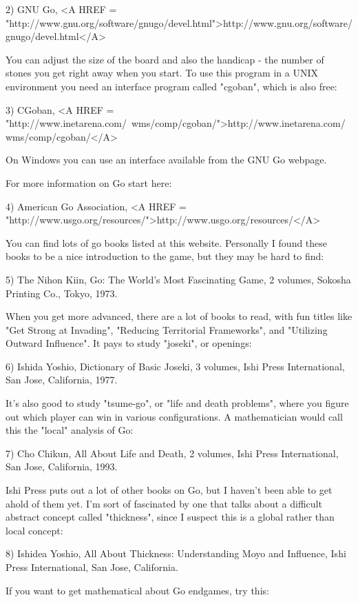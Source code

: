 2) GNU Go, <A HREF = "http://www.gnu.org/software/gnugo/devel.html">http://www.gnu.org/software/gnugo/devel.html</A>

You can adjust the size of the board and also the handicap - the number
of stones you get right away when you start.  To use this program in a
UNIX environment you need an interface program called
"cgoban", which is also free:

3) CGoban, <A HREF = "http://www.inetarena.com/~wms/comp/cgoban/">http://www.inetarena.com/~wms/comp/cgoban/</A>

On Windows you can use an interface available from the GNU Go webpage.

For more information on Go start here:

4) American Go Association, <A HREF = "http://www.usgo.org/resources/">http://www.usgo.org/resources/</A>

You can find lots of go books listed at this website.  Personally
I found these books to be a nice introduction to the game, but they
may be hard to find:

5) The Nihon Kiin, Go: The World's Most Fascinating Game, 2 volumes,
Sokosha Printing Co., Tokyo, 1973.

When you get more advanced, there are a lot of books to read, with 
fun titles like "Get Strong at Invading", "Reducing Territorial 
Frameworks", and "Utilizing Outward Influence".  It pays to study
"joseki", or openings:

6) Ishida Yoshio, Dictionary of Basic Joseki, 3 volumes, Ishi
Press International, San Jose, California, 1977.

It's also good to study "tsume-go", or "life and death problems", where
you figure out which player can win in various configurations.  A
mathematician would call this the "local" analysis of Go:

7) Cho Chikun, All About Life and Death, 2 volumes, Ishi Press 
International, San Jose, California, 1993.

Ishi Press puts out a lot of other books on Go, but I haven't been able
to get ahold of them yet.  I'm sort of fascinated by one that talks
about a difficult abstract concept called "thickness", since I suspect
this is a global rather than local concept:

8) Ishidea Yoshio, All About Thickness: Understanding Moyo and
Influence, Ishi Press International, San Jose, California.

If you want to get mathematical about Go endgames, try this:

